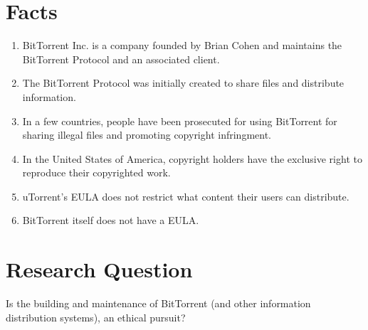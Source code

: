 \documentclass[11pt]{article}
\begin{document}
\section{Facts}
\begin{enumerate}
\item BitTorrent Inc. is a company founded by Brian Cohen and maintains the BitTorrent Protocol and an associated client. \cite{btabout}
\item The BitTorrent Protocol was initially created to share files and distribute information. \cite{btabout}
\item In a few countries, people have been prosecuted for using BitTorrent for sharing illegal files and promoting copyright infringment. \cite{tpbverdict}
\item In the United States of America, copyright holders have the exclusive right to reproduce their copyrighted work. \cite{t17c1s106}
\item uTorrent's EULA does not restrict what content their users can distribute. \cite{utorrentEula}
\item BitTorrent itself does not have a EULA. \cite{utorrentEula}
\end{enumerate}

\section{Research Question}

Is the building and maintenance of BitTorrent (and other information distribution systems), an ethical pursuit?
\end{document}
